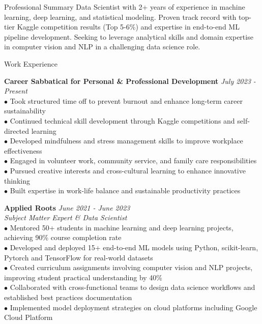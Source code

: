 \documentclass{resume} %
\begin{document}

\begin{rSection}{Professional Summary}
Data Scientist with 2+ years of experience in machine learning, deep learning, and statistical modeling. Proven track record with top-tier Kaggle competition results (Top 5-6\%) and expertise in end-to-end ML pipeline development. Seeking to leverage analytical skills and domain expertise in computer vision and NLP in a challenging data science role.
\end{rSection}


\begin{rSection}{Work Experience}

{\bf Career Sabbatical for Personal \& Professional Development} \hfill {\em July 2023 - Present}\\
$\bullet$ Took structured time off to prevent burnout and enhance long-term career sustainability\\
$\bullet$ Continued technical skill development through Kaggle competitions and self-directed learning\\
$\bullet$ Developed mindfulness and stress management skills to improve workplace effectiveness\\
$\bullet$ Engaged in volunteer work, community service, and family care responsibilities\\
$\bullet$ Pursued creative interests and cross-cultural learning to enhance innovative thinking\\
$\bullet$ Built expertise in work-life balance and sustainable productivity practices

{\bf Applied Roots} \hfill {\em June 2021 - June 2023}\\
{\em Subject Matter Expert \& Data Scientist} \\
$\bullet$ Mentored 50+ students in machine learning and deep learning projects, achieving 90\% course completion rate\\
$\bullet$ Developed and deployed 15+ end-to-end ML models using Python, scikit-learn, Pytorch and TensorFlow for real-world datasets\\
$\bullet$ Created curriculum assignments involving computer vision and NLP projects, improving student practical understanding by 40\%\\
$\bullet$ Collaborated with cross-functional teams to design data science workflows and established best practices documentation\\
$\bullet$ Implemented model deployment strategies on cloud platforms including Google Cloud Platform

\end{rSection}
\end{document}
